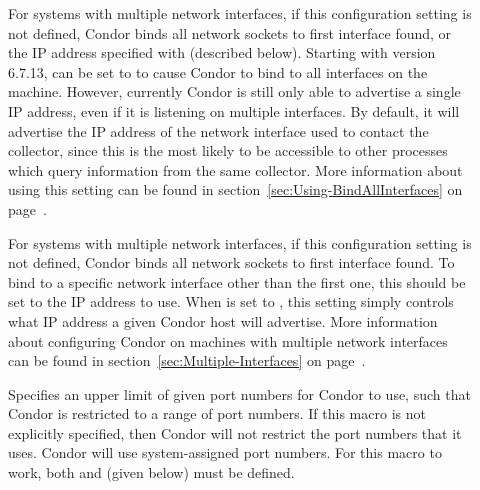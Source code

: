 \begin{description}

\item[] \label{param:BindAllInterfaces}
  For systems with multiple network interfaces, if this configuration
  setting is not defined, Condor binds all network sockets to first
  interface found, or the IP address specified with
   (described below).
  Starting with version 6.7.13,  can be
  set to \verb@TRUE@ to cause Condor to bind to all interfaces on the
  machine.
  However, currently Condor is still only able to advertise a single
  IP address, even if it is listening on multiple interfaces.  By
  default, it will advertise the IP address of the network interface
  used to contact the collector, since this is the most likely to be
  accessible to other processes which query information from the same
  collector.
  More information about using this setting can be found in
  section~\ref{sec:Using-BindAllInterfaces} on
  page~\pageref{sec:Using-BindAllInterfaces}. 

\item[] \label{param:NetworkInterface}
  For systems with multiple network interfaces, if this configuration
  setting is not defined, Condor binds all network sockets to first
  interface found.
  To bind to a specific network interface other than the
  first one, this  should be set to 
  the IP address to use.
  When  is set to \verb@TRUE@, this
  setting simply controls what IP address a given Condor host will
  advertise.
  More information about configuring Condor on machines with multiple
  network interfaces can be found in
  section~\ref{sec:Multiple-Interfaces} on
  page~\pageref{sec:Multiple-Interfaces}.

\item[] \label{param:HighPort}
  Specifies an upper limit of given port numbers for Condor to use,
  such that Condor is restricted to a range of port numbers.
  If this macro is not explicitly specified, then Condor will
  not restrict the port numbers that it uses. Condor will use
  system-assigned port numbers.
  For this macro to work, both  and
   (given below) must be defined.


\end{description}

